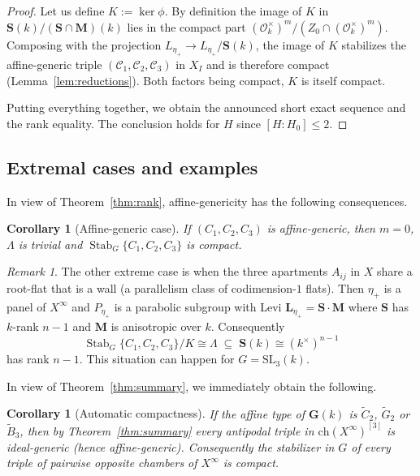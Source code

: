 \documentclass[11pt]{amsart}
\newcommand{\bdinf}{X^\infty}
\newcommand{\bfG}{\mathbf{G}}
\newcommand{\bfM}{\mathbf{M}}
\newcommand{\bfL}{\mathbf{L}}
\newcommand{\bfS}{\mathbf{S}}
\newcommand{\SL}{\mathrm{SL}}
\newcommand{\Ch}{\mathrm{ch}}
\DeclareMathOperator{\Stab}{Stab}
\theoremstyle{plain}
\newtheorem{cor}[thm]{Corollary}
\theoremstyle{definition}
\theoremstyle{remark}
\newtheorem{rem}[thm]{Remark}
\begin{document}
\begin{proof}
		Let us define $K:=\ker\phi$. By definition the image of $K$ in $\bfS(k)/(\bfS\cap\bfM)(k)$ lies in the compact part $(\mathcal O_k^\times)^m/(Z_0\cap(\mathcal O_k^\times)^m)$. Composing with the projection $L_{\eta_+}\to L_{\eta_+}/\bfS(k)$, the image of $K$ stabilizes the affine-generic triple $(\mathcal C_1,\mathcal C_2,\mathcal C_3)$ in $X_I$ and is therefore compact (Lemma~\ref{lem:reductions}). Both factors being compact, $K$ is itself compact.
		
		Putting everything together, we obtain the announced short exact sequence and the rank equality. The conclusion holds for $H$ since $[H:H_0]\le 2$.
	\end{proof}
	
	\subsection{Extremal cases and examples}
	
	In view of Theorem~\ref{thm:rank}, affine-genericity has the following consequences. 
	
	\begin{cor}[Affine-generic case]\label{cor:m0}
		If $(C_1,C_2,C_3)$ is affine-generic, then $m=0$, $\Lambda$ is trivial and $\Stab_G\{C_1,C_2,C_3\}$ is compact.
	\end{cor}
	\begin{rem}
	\label{rem::extremal_case}
		The other extreme case is when the three apartments $A_{ij}$ in $X$ share a root-flat that is a wall (a parallelism class of codimension-$1$ flats). Then $\eta_+$ is a panel of $\bdinf$ and $P_{\eta_+}$ is a parabolic subgroup with Levi $\bfL_{\eta_+}=\bfS\cdot\bfM$ where $\bfS$ has $k$-rank $n-1$ and $\bfM$ is anisotropic over $k$. Consequently
		\[
		\Stab_G\{C_1,C_2,C_3\}/K \cong \Lambda\;\subseteq\;\bfS(k)\cong (k^\times)^{n-1}
		\]
		has rank $n-1$. This situation can happen for $G=\SL_3(k)$. 
	\end{rem}
	
	In view of Theorem~\ref{thm:summary}, we immediately obtain the following. 
	\begin{cor}[Automatic compactness]\label{cor:auto}
		If the affine type of $\bfG(k)$ is $\widetilde C_2$, $\widetilde G_2$ or $\widetilde B_3$, then by Theorem~\ref{thm:summary} every antipodal triple in $\Ch(X^\infty)^{[3]}$ is ideal-generic (hence affine-generic). Consequently the stabilizer in $G$ of every triple of pairwise opposite chambers of $X^\infty$ is compact.
	\end{cor}
	
\end{document}
